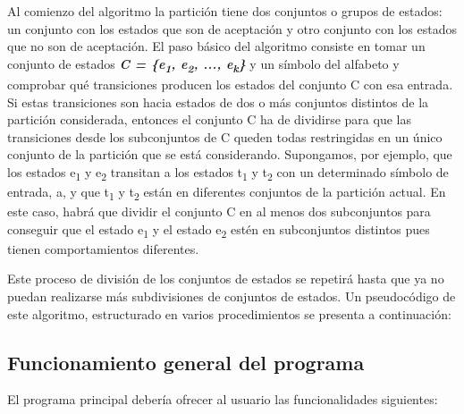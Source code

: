 Al comienzo del algoritmo la partición tiene dos conjuntos o grupos de estados\+: un conjunto con los estados que son de aceptación y otro conjunto con los estados que no son de aceptación. El paso básico del algoritmo consiste en tomar un conjunto de estados {\itshape {\bfseries C = \{e\textsubscript{1}, e\textsubscript{2}, ..., e\textsubscript{k}\}}} y un símbolo del alfabeto y comprobar qué transiciones producen los estados del conjunto C con esa entrada. Si estas transiciones son hacia estados de dos o más conjuntos distintos de la partición considerada, entonces el conjunto C ha de dividirse para que las transiciones desde los subconjuntos de C queden todas restringidas en un único conjunto de la partición que se está considerando. Supongamos, por ejemplo, que los estados e\textsubscript{1} y e\textsubscript{2} transitan a los estados t\textsubscript{1} y t\textsubscript{2} con un determinado símbolo de entrada, a, y que t\textsubscript{1} y t\textsubscript{2} están en diferentes conjuntos de la partición actual. En este caso, habrá que dividir el conjunto C en al menos dos subconjuntos para conseguir que el estado e\textsubscript{1} y el estado e\textsubscript{2} estén en subconjuntos distintos pues tienen comportamientos diferentes.

Este proceso de división de los conjuntos de estados se repetirá hasta que ya no puedan realizarse más subdivisiones de conjuntos de estados. Un pseudocódigo de este algoritmo, estructurado en varios procedimientos se presenta a continuación\+:



\subsection*{Funcionamiento general del programa}

El programa principal debería ofrecer al usuario las funcionalidades siguientes\+:


